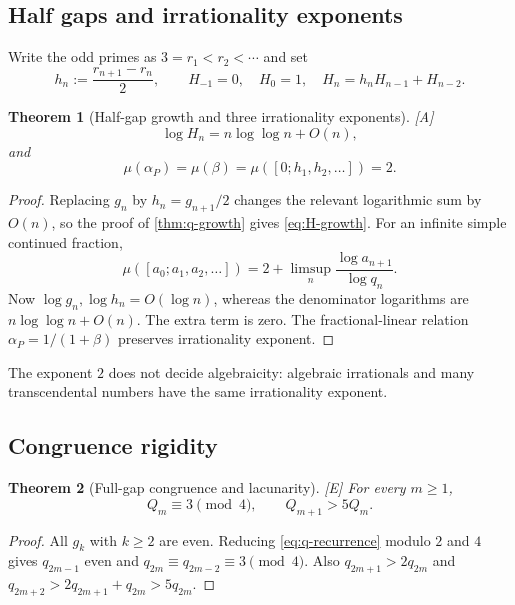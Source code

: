 \documentclass[11pt]{article}
\newtheorem{theorem}{Theorem}[section]
\theoremstyle{definition}
\theoremstyle{remark}
\newcommand{\status}[1]{\textnormal{\textcolor{accent}{\footnotesize[#1]}}}
\begin{document}
\subsection{Half gaps and irrationality exponents}

Write the odd primes as $3=r_1<r_2<\cdots$ and set
\[
 h_n:=\frac{r_{n+1}-r_n}{2},\qquad
 H_{-1}=0,\quad H_0=1,\quad
 H_n=h_nH_{n-1}+H_{n-2}.
\]

\begin{theorem}[Half-gap growth and three irrationality exponents]
\label{thm:half-gap-growth}
\status{A}
\begin{equation}\label{eq:H-growth}
 \log H_n=n\log\log n+O(n),
\end{equation}
and
\begin{equation}\label{eq:mu-two}
 \mu(\alpha_P)=\mu(\beta)
 =\mu([0;h_1,h_2,\ldots])=2.
\end{equation}
\end{theorem}

\begin{proof}
Replacing $g_n$ by $h_n=g_{n+1}/2$ changes the relevant logarithmic sum by $O(n)$, so
the proof of \cref{thm:q-growth} gives \eqref{eq:H-growth}.  For an infinite simple
continued fraction,
\[
 \mu([a_0;a_1,a_2,\ldots])
 =2+\limsup_n\frac{\log a_{n+1}}{\log q_n}.
\]
Now $\log g_n,\log h_n=O(\log n)$, whereas the denominator logarithms are
$n\log\log n+O(n)$.  The extra term is zero.  The fractional-linear relation
$\alpha_P=1/(1+\beta)$ preserves irrationality exponent.
\end{proof}

The exponent $2$ does not decide algebraicity: algebraic irrationals and many
transcendental numbers have the same irrationality exponent.

\subsection{Congruence rigidity}

\begin{theorem}[Full-gap congruence and lacunarity]\label{thm:Q-congruence}
\status{E}
For every $m\ge1$,
\begin{equation}\label{eq:Q-mod4-gap}
 Q_m\equiv3\pmod4,\qquad Q_{m+1}>5Q_m.
\end{equation}
\end{theorem}

\begin{proof}
All $g_k$ with $k\ge2$ are even.  Reducing \eqref{eq:q-recurrence} modulo $2$ and
$4$ gives $q_{2m-1}$ even and
$q_{2m}\equiv q_{2m-2}\equiv3\pmod4$.  Also
$q_{2m+1}>2q_{2m}$ and
$q_{2m+2}>2q_{2m+1}+q_{2m}>5q_{2m}$.
\end{proof}
\end{document}
